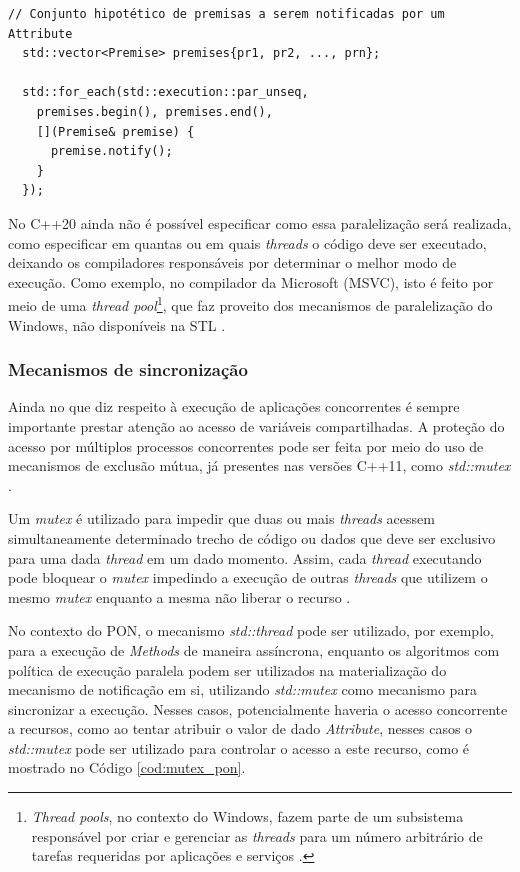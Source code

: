 \begin{lstlisting}[caption = {Uso de políticas de execução no PON},
  source = {Autoria própria}, float=htb,
  label = {cod:policy_nop}]
  // Conjunto hipotético de premisas a serem notificadas por um Attribute  
  std::vector<Premise> premises{pr1, pr2, ..., prn};

  std::for_each(std::execution::par_unseq,
    premises.begin(), premises.end(),
    [](Premise& premise) {
      premise.notify();
    }
  });
\end{lstlisting}

No C++20 ainda não é possível especificar como essa paralelização será
realizada, como especificar em quantas ou em quais \textit{threads} o código
deve ser executado, deixando os compiladores responsáveis por determinar o
melhor modo de execução. Como exemplo, no compilador da Microsoft (MSVC), isto é
feito por meio de uma \textit{thread pool}\footnote{\textit{Thread pools}, no
contexto do Windows, fazem parte de um subsistema responsável por criar e
gerenciar as \textit{threads} para um número arbitrário de tarefas requeridas
por aplicações e serviços \cite{teixeira_2012}.}, que faz proveito dos
mecanismos de paralelização do Windows, não disponíveis na STL
\cite{oneal_2018}.

\subsubsection{Mecanismos de sincronização}

Ainda no que diz respeito à execução de aplicações concorrentes é sempre
importante prestar atenção ao acesso de variáveis compartilhadas. A proteção do
acesso por múltiplos processos concorrentes pode ser feita por meio do uso de
mecanismos de exclusão mútua, já presentes nas versões C++11, como
\textit{std::mutex} \cite{boccara_2019}.

Um \textit{mutex} é utilizado para impedir que duas ou mais \textit{threads}
acessem simultaneamente determinado trecho de código ou dados que deve ser
exclusivo para uma dada \textit{thread} em um dado momento. Assim, cada
\textit{thread} executando pode bloquear o \textit{mutex} impedindo a execução
de outras \textit{threads} que utilizem o mesmo \textit{mutex} enquanto a mesma
não liberar o recurso \cite{boccara_2019}.

No contexto do PON, o mecanismo \textit{std::thread} pode ser utilizado, por
exemplo, para a execução de \textit{Methods} de maneira assíncrona, enquanto os
algoritmos com política de execução paralela podem ser utilizados na
materialização do mecanismo de notificação em si, utilizando \textit{std::mutex}
como mecanismo para sincronizar a execução. Nesses casos, potencialmente haveria
o acesso concorrente a recursos, como ao tentar atribuir o valor de dado
\textit{Attribute}, nesses casos o \textit{std::mutex} pode ser utilizado para
controlar o acesso a este recurso, como é mostrado no Código
\ref{cod:mutex_pon}. 

